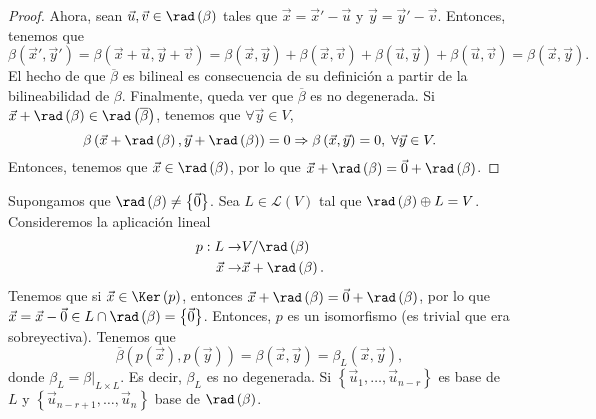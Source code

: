 \begin{proof}
Ahora, sean $\displaystyle \vec{u}, \vec{v} \in\rad\left(\beta \right) $ tales que $\displaystyle \vec{x} = \vec{x}'- \vec{u} $ y $\displaystyle \vec{y} = \vec{y}'-\vec{v} $. Entonces, tenemos que 
\[
	\beta\left(\vec{x}', \vec{y}'\right) =  \beta\left(\vec{x} + \vec{u}, \vec{y} + \vec{v}\right) = \beta\left(\vec{x}, \vec{y}\right) + \beta\left(\vec{x}, \vec{v}\right) + \beta\left(\vec{u}, \vec{y}\right) + \beta\left(\vec{u}, \vec{v}\right) = \beta\left(\vec{x}, \vec{y}\right) .
\]
El hecho de que $\displaystyle \overline{\beta } $ es bilineal es consecuencia de su definición a partir de la bilineabilidad de $\displaystyle \beta  $. Finalmente, queda ver que $\displaystyle \overline{\beta } $ es no degenerada. Si $\displaystyle \vec{x} + \rad\left(\beta \right) \in \rad\left(\overline{\beta } \right) $, tenemos que $\displaystyle \forall \vec{y}\in V $, 
\[ \beta\left(\vec{x} + \rad\left(\beta \right), \vec{y} + \rad\left(\beta \right)\right) =0 \Rightarrow \beta\left(\vec{x}, \vec{y}\right) = 0, \; \forall \vec{y} \in V .\]
Entonces, tenemos que $\displaystyle \vec{x} \in \rad\left(\beta \right) $, por lo que $\displaystyle \vec{x} + \rad\left(\beta \right) = \vec{0} + \rad\left(\beta\right) $.
\end{proof}
Supongamos que $\displaystyle \rad\left(\beta \right) \neq \left\{ \vec{0}\right\}  $. Sea $\displaystyle L \in \mathcal{L}\left(V\right) $ tal que $\displaystyle \rad\left(\beta \right)\oplus L = V $. Consideremos la aplicación lineal 
\[
\begin{split}
	p : L \to & V/\rad\left(\beta \right) \\
	\vec{x} \to & \vec{x} + \rad\left(\beta \right).
\end{split}
\]
Tenemos que si $\displaystyle \vec{x} \in \Ker\left(p\right) $, entonces $\displaystyle \vec{x} + \rad\left(\beta \right) = \vec{0} + \rad\left(\beta \right) $, por lo que $\displaystyle \vec{x} = \vec{x}- \vec{0} \in L \cap \rad\left(\beta \right) = \left\{ \vec{0}\right\}  $. Entonces, $\displaystyle p $ es un isomorfismo (es trivial que era sobreyectiva).
Tenemos que 
\[ \overline{\beta }\left(p\left(\vec{x}\right), p\left(\vec{y}\right)\right) = \beta\left(\vec{x}, \vec{y}\right) = \beta_{L}\left(\vec{x}, \vec{y}\right) ,\]
donde $\displaystyle \beta_{L} = \beta|_{L \times L} $. Es decir, $\displaystyle \beta_{L} $ es no degenerada. Si $\displaystyle \left\{ \vec{u}_{1}, \ldots, \vec{u}_{n-r}\right\}  $ es base de $\displaystyle L $ y $\displaystyle \left\{ \vec{u}_{n-r+1}, \ldots, \vec{u}_{n}\right\}  $ base de $\displaystyle \rad\left(\beta \right) $. 
